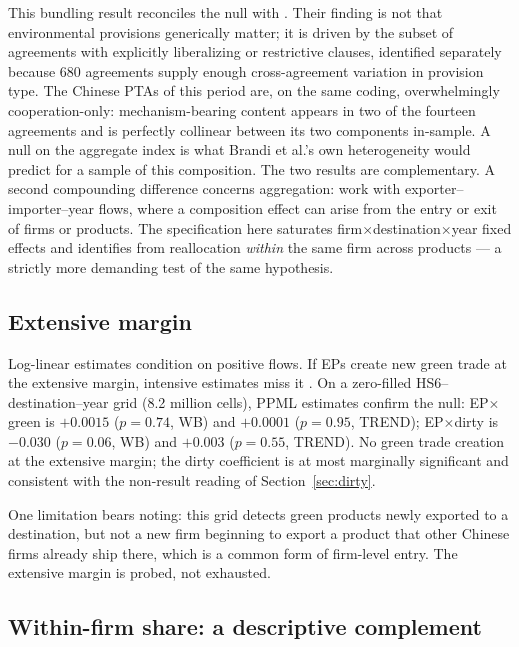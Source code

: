\documentclass[12pt]{article}
\begin{document}
This bundling result reconciles the null with \citet{brandi2020}. Their finding is not
that environmental provisions generically matter; it is driven by the subset of agreements
with explicitly liberalizing or restrictive clauses, identified separately because 680
agreements supply enough cross-agreement variation in provision type. The Chinese PTAs of
this period are, on the same coding, overwhelmingly cooperation-only: mechanism-bearing
content appears in two of the fourteen agreements and is perfectly collinear between its
two components in-sample. A null on the aggregate index is what Brandi et al.'s own
heterogeneity would predict for a sample of this composition. The two results are
complementary. A second compounding difference concerns aggregation: \citet{brandi2020}
work with exporter--importer--year flows, where a composition effect can arise from the
entry or exit of firms or products. The specification here saturates
firm$\times$destination$\times$year fixed effects and identifies from reallocation
\emph{within} the same firm across products --- a strictly more demanding test of the
same hypothesis.

\subsection{Extensive margin}

Log-linear estimates condition on positive flows. If EPs create new green trade at the
extensive margin, intensive estimates miss it \citep{santossilva2006}. On a zero-filled
HS6--destination--year grid (8.2 million cells), PPML estimates confirm the null:
EP$\times$green is $+0.0015$ ($p = 0.74$, WB) and $+0.0001$ ($p = 0.95$, TREND);
EP$\times$dirty is $-0.030$ ($p = 0.06$, WB) and $+0.003$ ($p = 0.55$, TREND). No
green trade creation at the extensive margin; the dirty coefficient is at most marginally
significant and consistent with the non-result reading of Section~\ref{sec:dirty}.

One limitation bears noting: this grid detects green products newly exported to a
destination, but not a new firm beginning to export a product that other Chinese firms
already ship there, which is a common form of firm-level entry. The extensive margin is
probed, not exhausted.

\subsection{Within-firm share: a descriptive complement}
\end{document}
